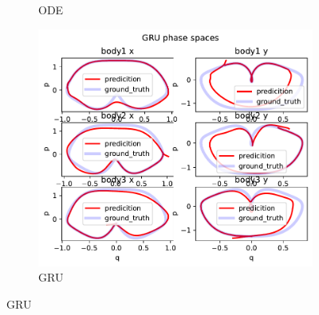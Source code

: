 \begin{figure}[H]
\begin{subfigure}[b]{0.3\textwidth}
		\caption{ODE}
	\end{subfigure}
	\hfill
	\begin{subfigure}[b]{0.3\textwidth}
		\centering
		\includegraphics[width=\textwidth]{chapters/chapter5/body3_gru_ps.pdf}
		\caption{GRU}
	\end{subfigure}
	
	\vspace{0.5cm} %
	

\end{figure}
